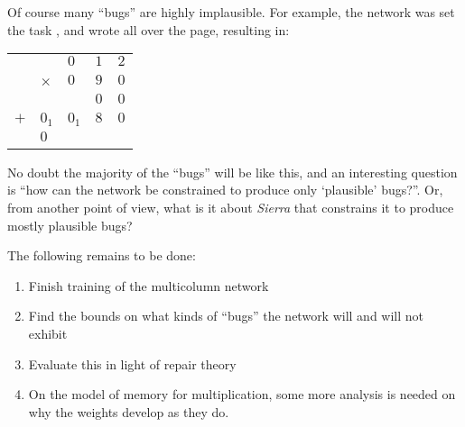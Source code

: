 Of course many ``bugs'' are highly implausible.  For example, the network
was set the task , and wrote all over the page, resulting in:
\begin{center}
\begin{tabular}{lllll}
&&$0_{}$&$1_{}$&$2_{}$\\
&$\times$&$0_{}$&$9_{}$&$0_{}$\\
\cline{2-5}
&&&$0_{}$&$0_{}$\\
$+$&$0_{1}$&$0_{1}$&$8_{}$&$0_{}$\\
\cline{1-5}
&$0_{}$&&&\\
\end{tabular}
\end{center}

No doubt the majority of the ``bugs'' will be like this, and an interesting
question is ``how can the network be constrained to produce only
`plausible' bugs?''.  Or, from another point of view, what is it about {\em
Sierra} that constrains it to produce mostly plausible bugs?


The following remains to be done:
\begin{enumerate}
\item Finish training of the multicolumn network
\item Find the bounds on what kinds of ``bugs'' the network will and will
not exhibit
\item Evaluate this in light of repair theory
\item On the model of memory for multiplication, some more analysis is
needed on why the weights develop as they do.
\end{enumerate}



